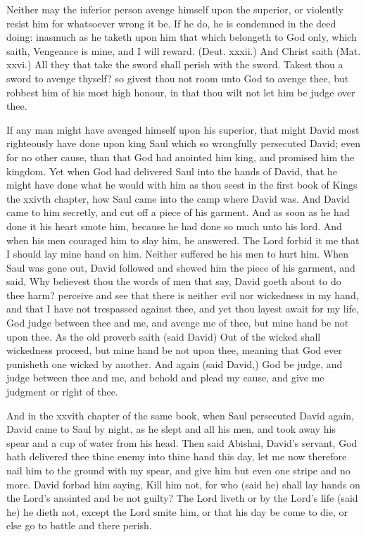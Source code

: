 Neither may the inferior person avenge himself upon 
the superior, or violently resist him for whatsoever wrong 
it be. If he do, he is condemned in the deed doing: 
inasmuch as he taketh upon him that which belongeth to 
God only, which saith, Vengeance is mine, and I will reward.
(Deut. xxxii.) And Christ saith (Mat. xxvi.) All 
they that take the sword shall perish with the sword. 
Takest thou a sword to avenge thyself? so givest thou not 
room unto God to avenge thee, but robbest him of his 
most high honour, in that thou wilt not let him be judge 
over thee. 

If any man might have avenged himself upon his superior,
that might David most righteously have done upon
king Saul which so wrongfully persecuted David; even 
for no other cause, than that God had anointed him king, 
and promised him the kingdom. Yet when God had delivered
Saul into the hands of David, that he might have 
done what he would with him as thou seest in the first book 
of Kings the xxivth chapter, how Saul came into the camp 
where David was. And David came to him secretly, and 
cut off a piece of his garment. And as soon as he had 
done it his heart smote him, because he had done so much 
unto his lord. And when his men couraged him to slay 
him, he answered. The Lord forbid it me that I should 
lay mine hand on him. Neither suffered he his men to 
hurt him. When Saul was gone out, David followed and 
shewed him the piece of his garment, and said, Why believest
thou the words of men that say, David goeth about 
to do thee harm? perceive and see that there is neither 
evil nor wickedness in my hand, and that I have not trespassed
against thee, and yet thou layest await for my life, 
God judge between thee and me, and avenge me of thee, 
but mine hand be not upon thee. As the old proverb saith 
(said David) Out of the wicked shall wickedness proceed, 
but mine hand be not upon thee, meaning that God ever 
punisheth one wicked by another. And again (said David,) 
God be judge, and judge between thee and me, and 
behold and plead my cause, and give me judgment or right 
of thee. 

And in the xxvith chapter of the same book, when Saul 
persecuted David again, David came to Saul by night, 
as he slept and all his men, and took away his spear and a 
cup of water from his head. Then said Abishai, David's
servant, God hath delivered thee thine enemy into thine 
hand this day, let me now therefore nail him to the ground 
with my spear, and give him but even one stripe and no 
more. David forbad him saying, Kill him not, for who 
(said he) shall lay hands on the Lord's anointed and be 
not guilty? The Lord liveth or by the Lord's life (said he) 
he dieth not, except the Lord smite him, or that his day be 
come to die, or else go to battle and there perish.

